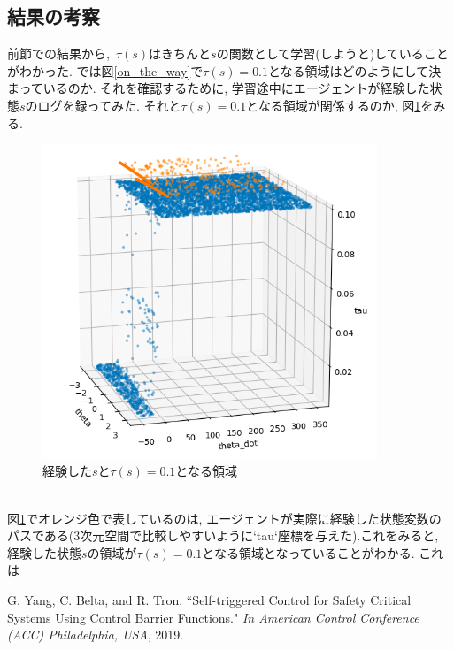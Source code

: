 \documentclass{jsarticle}
\begin{document}
\subsection{結果の考察}
前節での結果から,~$\tau(s)$はきちんと$s$の関数として学習(しようと)していることがわかった. では図\ref{on_the_way}で$\tau(s)=0.1$となる領域はどのようにして決まっているのか. それを確認するために, 学習途中にエージェントが経験した状態$s$のログを録ってみた. それと$\tau(s)=0.1$となる領域が関係するのか, 図\ref{state_log_and_tau}をみる.
\begin{figure}[h]
	\centering
 	\includegraphics[width=10cm]{state_log_and_tau.png}
 	\caption{経験した$s$と$\tau(s)=0.1$となる領域}  \label{state_log_and_tau}
\end{figure}\\
図\ref{state_log_and_tau}でオレンジ色で表しているのは, エージェントが実際に経験した状態変数のパスである(3次元空間で比較しやすいように`tau`座標を与えた).これをみると, 経験した状態$s$の領域が$\tau(s)=0.1$となる領域となっていることがわかる. これは
\newpage


\begin{thebibliography}{10}
G. Yang, C. Belta, and R. Tron. “Self-triggered Control for Safety Critical Systems Using Control Barrier Functions."  \textit{In American Control Conference (ACC) Philadelphia, USA}, 2019.
 
 \end{thebibliography}
\end{document}
